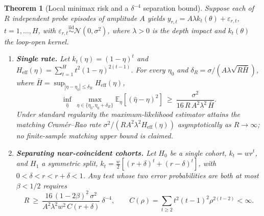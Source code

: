 \documentclass[10pt,twocolumn,letterpaper]{article}
\newtheorem{theorem}{Theorem}[section]
\theoremstyle{definition}
\theoremstyle{remark}
\begin{document}
\begin{theorem}[Local minimax risk and a $\delta^{-4}$ separation bound]
\label{thm:m2_sample_complexity}
Suppose each of $R$ independent probe episodes of amplitude $A$ yields $y_{r,t}=A\lambda k_t(\theta)+\varepsilon_{r,t}$, $t=1,\ldots,H$, with $\varepsilon_{r,t}\stackrel{\text{iid}}{\sim}\mathcal N(0,\sigma^2)$, where $\lambda>0$ is the depth impact and $k_t(\theta)$ the loop-open kernel.
\begin{enumerate}
    \item \textbf{Single rate.} Let $k_t(\eta)=(1-\eta)^t$ and $H_{\mathrm{eff}}(\eta)=\sum_{t=1}^H t^2(1-\eta)^{2(t-1)}$. For every $\eta_0$ and $\delta_R=\sigma/(A\lambda\sqrt{R\bar H})$, where $\bar H=\sup_{|\eta-\eta_0|\le\delta_R}H_{\mathrm{eff}}(\eta)$,
    \begin{equation}
        \inf_{\hat{\eta}}\ \max_{\eta\in\{\eta_0,\eta_0+\delta_R\}} \mathbb{E}_\eta\left[(\hat{\eta} - \eta)^2\right] \ \ge\ \frac{\sigma^2}{16\,R\,A^2\lambda^2\,\bar H}.
        \label{eq:le_cam_rate}
    \end{equation}
    Under standard regularity the maximum-likelihood estimator attains the matching Cram\'er--Rao rate $\sigma^2/(RA^2\lambda^2H_{\mathrm{eff}}(\eta))$ asymptotically as $R\to\infty$; no finite-sample matching upper bound is claimed.
    \item \textbf{Separating near-coincident cohorts.} Let $H_0$ be a single cohort, $k_t=w r^t$, and $H_1$ a symmetric split, $k_t=\tfrac w2[(r+\delta)^t+(r-\delta)^t]$, with $0<\delta<r<r+\delta<1$. Any test whose two error probabilities are both at most $\beta<1/2$ requires
    \begin{equation}
        R\ \ge\ \frac{16\,(1-2\beta)^2\,\sigma^2}{A^2\lambda^2w^2\,C(r+\delta)}\ \delta^{-4},
        \qquad C(\rho)=\sum_{t\ge2}t^2(t-1)^2\rho^{2(t-2)}<\infty .
        \label{eq:separation_rate}
    \end{equation}
\end{enumerate}
\end{theorem}
\end{document}
